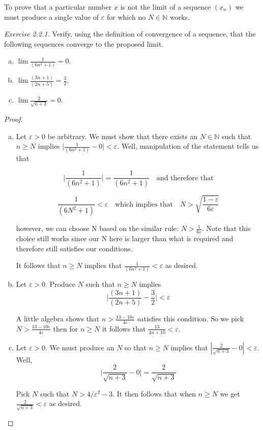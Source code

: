 \documentclass{tufte-book}
\theoremstyle{definition}
\numberwithin{section}{chapter}
\begin{document}
To prove that a particular number $x$ is not the limit of a sequence $(x_{n})$ we must produce a single value of $\varepsilon$ for which no $N \in \mathbb{N}$ works.
\medskip

\noindent
\emph{Exercise 2.2.1.} Verify, using the definition of convergence of a sequence, that
the following sequences converge to the proposed limit.
\begin{enumerate}[(a)]
\item $\lim \frac{1}{(6n^{2}+1)} = 0$.
\item $\lim \frac{(3n+1)}{(2n+5)} = \frac{3}{2}$.
\item $\lim \frac{ 2}{\sqrt{n+3}} = 0$.
\end{enumerate}

\begin{proof}
	\begin{enumerate}[(a)]
			\item Let $\varepsilon > 0$ be arbitrary. We must show that there exists an
$N \in \mathbb{N}$ such that $n\geq N$ implies $\big|\frac{1}{(6n^{2}+1)} - 0 \big|  < \varepsilon$.  Well, manipulation of the statement tells us that 

$$\bigg|\frac{1}{(6n^{2}+1)} \bigg|  = \frac{1}{(6n^{2}+1)}  \quad \text{and therefore that}$$

$$ \frac{1}{(6N^{2}+1)}  < \varepsilon \quad \text{which implies that} \quad N > \sqrt{\frac{1- \varepsilon}{6\varepsilon}}$$

however, we can choose N based on the similar rule: $N > \frac{1}{6\varepsilon}$. Note that this choice still works since our N here is larger than what is required and therefore still satisfies our conditions.  

It follows that $n \geq N$  implies that $\frac{1}{(6n^{2}+1)}  < \varepsilon$ as desired.


\item  Let $\varepsilon>0$.  Produce $N$ such that $n\geq N$ implies
$$   \bigg|\frac{(3n+1)}{(2n+5)} -\frac{3}{2}\bigg| <  \varepsilon $$

A little algebra shows that $n>\frac{13-10\varepsilon}{4\varepsilon}$ satisfies this condition.  So we pick $N >\frac{13-10\varepsilon}{4\varepsilon}$ then for $n \geq N$ it follows that $\frac{13}{4n+10} < \varepsilon$.


  \item Let $\varepsilon>0$.  We must produce an $N$ so that $n \geq N$ implies that $|\frac{2}{\sqrt{n+3}} - 0|< \varepsilon$.  Well,
  $$ \bigg| \frac{2}{\sqrt{n+3}} - 0 \bigg| = \frac{2}{\sqrt{n+3}} 	$$
  
  Pick $N$ such that $N > 4/{\varepsilon^2} - 3$.  It then follows that when $n \geq N$ we get $\frac{2}{\sqrt{n+3}} <\varepsilon$ as desired.
	\end{enumerate}
\end{proof}
\end{document}
